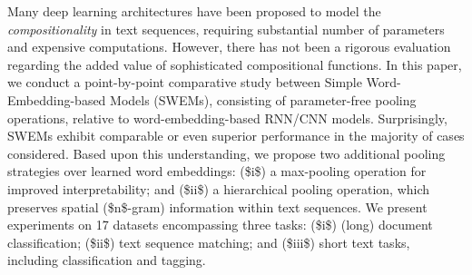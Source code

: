 Many deep learning architectures have been proposed to model the \emph{compositionality} in text sequences, requiring substantial number of parameters and expensive computations. However, there has not been a rigorous evaluation regarding the added value of sophisticated compositional functions. In this paper, we conduct a point-by-point comparative study between Simple Word-Embedding-based Models (SWEMs), consisting of parameter-free pooling operations, relative to word-embedding-based RNN/CNN models. Surprisingly, SWEMs exhibit comparable or even superior performance in the majority of cases considered. Based upon this understanding, we propose two additional pooling strategies over learned word embeddings: (\$i\$) a max-pooling operation for improved interpretability; and (\$ii\$) a hierarchical pooling operation, which preserves spatial (\$n\$-gram) information within text sequences. We present experiments on 17 datasets encompassing three tasks: (\$i\$) (long) document classification; (\$ii\$) text sequence matching; and (\$iii\$) short text tasks, including classification and tagging.
